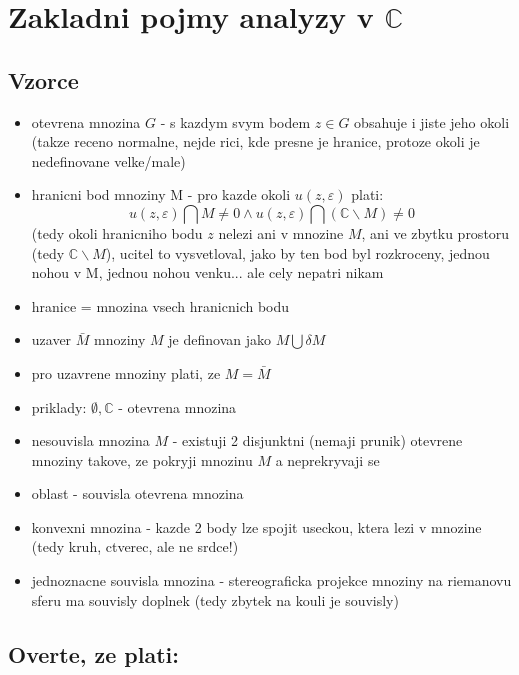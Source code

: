 \chapter{Zakladni pojmy analyzy v $\mathbb{C}$}

\section*{Vzorce}
\begin{itemize}
\item otevrena mnozina $G$ - s kazdym svym bodem $z \in G$ obsahuje i jiste jeho okoli (takze receno normalne, nejde rici, kde presne je hranice, protoze okoli je nedefinovane velke/male)
\item hranicni bod mnoziny M - pro kazde okoli $u(z,\varepsilon)$ plati:
$$u(z,\varepsilon) \bigcap M \neq 0 \wedge u(z,\varepsilon) \bigcap ( \mathbb{C} \backslash M) \neq 0$$
(tedy okoli hranicniho bodu $z$ nelezi ani v mnozine $M$, ani ve zbytku prostoru (tedy $\mathbb{C}\backslash M$), ucitel to vysvetloval, jako by ten bod byl rozkroceny, jednou nohou v M, jednou nohou venku... ale cely nepatri nikam
\item hranice = mnozina vsech hranicnich bodu
\item uzaver $\bar{M}$ mnoziny $M$ je definovan jako $M \bigcup \delta M$
\item pro uzavrene mnoziny plati, ze $M = \bar{M}$
\item priklady: $\emptyset, \mathbb{C}$ - otevrena mnozina
\item nesouvisla mnozina $M$ - existuji 2 disjunktni (nemaji prunik) otevrene mnoziny takove, ze pokryji mnozinu $M$ a neprekryvaji se
\item oblast - souvisla otevrena mnozina
\item konvexni mnozina - kazde 2 body lze spojit useckou, ktera lezi v mnozine (tedy kruh, ctverec, ale ne srdce!)
\item jednoznacne souvisla mnozina - stereograficka projekce mnoziny na riemanovu sferu ma souvisly doplnek (tedy zbytek na kouli je souvisly)
\end{itemize}

\newpage

\section{Overte, ze plati:}
